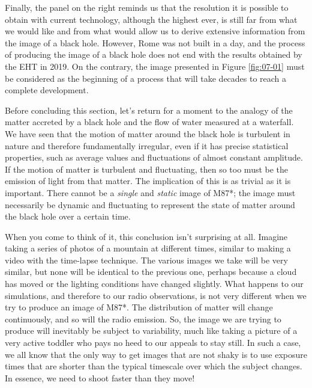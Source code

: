 Finally, the panel on the right reminds us that the resolution it is possible to obtain
with current technology, although the highest ever, is still far from what we would like
and from what would allow us to derive extensive information from the image of a black
hole. However, Rome was not built in a day, and the process of producing the image of a
black hole does not end with the results obtained by the EHT in 2019. On the contrary,
the image presented in Figure \ref{fig:07-01} must be considered as the beginning of a process that
will take decades to reach a complete development.

Before concluding this section, let's return for a moment to the analogy of the matter
accreted by a black hole and the flow of water measured at a waterfall. We have seen
that the motion of matter around the black hole is turbulent in nature and therefore
fundamentally irregular, even if it has precise statistical properties, such as average
values and fluctuations of almost constant amplitude. If the motion of matter is
turbulent and fluctuating, then so too must be the emission of light from that matter.
The implication of this is as trivial as it is important. There cannot be a
\emph{single} and \emph{static} image of M87*; the image must
necessarily be dynamic and fluctuating to represent the state of matter around the black
hole over a certain time.

When you come to think of it, this conclusion isn't surprising at all. Imagine taking a
series of photos of a mountain at different times, similar to making a video with the
time-lapse technique. The various images we take will be very similar, but none will be
identical to the previous one, perhaps because a cloud has moved or the lighting
conditions have changed slightly. What happens to our simulations, and therefore to our
radio observations, is not very different when we try to produce an image of
M87*. The distribution of matter will change continuously, and so
will the radio emission. So, the image we are trying to produce will inevitably be
subject to variability, much like taking a picture of a very active
toddler who pays no heed to our appeals to stay still. In such a case, we all know that
the only way to get images that are not shaky is to use exposure times that are shorter
than the typical timescale over which the subject changes. In essence, we need to shoot
faster than they move!

